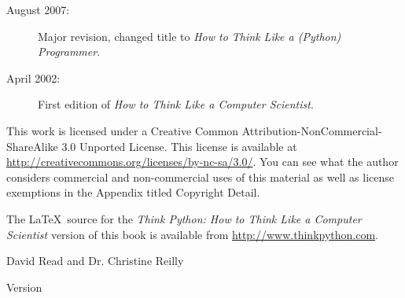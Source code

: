 \begin{latexonly}
{\begin{description}
\item[August 2007:] Major revision, changed title to
\emph{How to Think Like a (Python) Programmer}.

\item[April 2002:] First edition of \emph{How to Think Like
a Computer Scientist}.

\end{description}

\vspace{0.2in}

This work is licensed under a 
Creative Common
Attribution-NonCommercial-ShareAlike 3.0 Unported License.
This license is 
available at
\url{http://creativecommons.org/licenses/by-nc-sa/3.0/}.  You can 
see what the author considers commercial and non-commercial
uses of this material as well as license exemptions 
in the Appendix titled Copyright Detail.

The \LaTeX\ source for the 
\emph{Think Python: How to Think Like
a Computer Scientist}
version of this book is available from
\url{http://www.thinkpython.com}.

\vspace{0.2in}

} %

\end{latexonly}





{\Large \thetitle}

{\large David Read and Dr. Christine Reilly}

Version \theversion

\setcounter{chapter}{0}

